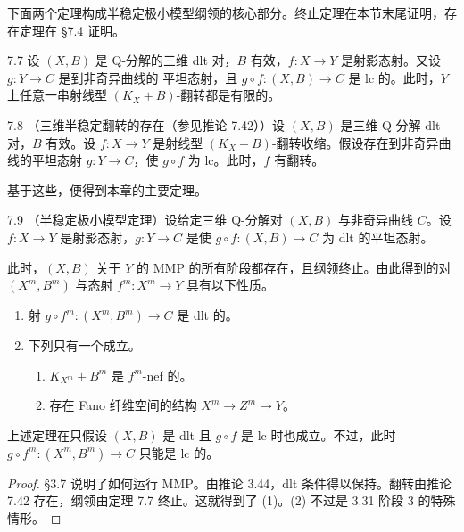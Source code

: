 下面两个定理构成半稳定极小模型纲领的核心部分。终止定理在本节末尾证明，存在定理在 §7.4 证明。

\begin{theorem*}{7.7}
设 $(X,B)$ 是 Q-分解的三维 dlt 对，$B$ 有效，$f\colon X\to Y$ 是射影态射。又设 $g\colon Y\to C$ 是到非奇异曲线的
平坦态射，且 $g\circ f\colon(X,B)\to C$ 是 lc 的。此时，$Y$ 上任意一串射线型 $(K_X+B)$-翻转都是有限的。
\end{theorem*}

\begin{theorem*}{7.8}
（三维半稳定翻转的存在（参见推论 7.42））设 $(X,B)$ 是三维 Q-分解 dlt 对，$B$ 有效。设 $f\colon X\to Y$ 是射线型 $(K_X+B)$-翻转收缩。假设存在到非奇异曲线的平坦态射 $g\colon Y\to C$，使 $g\circ f$ 为 lc。此时，$f$ 有翻转。
\end{theorem*}

基于这些，便得到本章的主要定理。

\begin{theorem*}{7.9}
（半稳定极小模型定理）设给定三维 Q-分解对 $(X,B)$ 与非奇异曲线 $C$。设 $f\colon X\to Y$ 是射影态射，$g\colon Y\to C$ 是使 $g\circ f\colon(X,B)\to C$ 为 dlt 的平坦态射。

此时，$(X,B)$ 关于 $Y$ 的 MMP 的所有阶段都存在，且纲领终止。由此得到的对 $(X^m,B^m)$ 与态射 $f^m\colon X^m\to Y$ 具有以下性质。
\begin{enumerate}[label=(\arabic*),leftmargin=2.4em,itemsep=1pt,topsep=2pt,parsep=0pt]
\item 射 $g\circ f^m\colon(X^m,B^m)\to C$ 是 dlt 的。
\item 下列只有一个成立。
\begin{enumerate}[label=(\alph*),leftmargin=2.2em,itemsep=1pt,topsep=1pt,parsep=0pt]
\item $K_{X^m}+B^m$ 是 $f^m$-nef 的。
\item 存在 Fano 纤维空间的结构 $X^m\to Z^m\to Y$。
\end{enumerate}
\end{enumerate}
\end{theorem*}


上述定理在只假设 $(X,B)$ 是 dlt 且 $g\circ f$ 是 lc 时也成立。不过，此时 $g\circ f^m\colon(X^m,B^m)\to C$ 只能是 lc 的。

\begin{proof}
§3.7 说明了如何运行 MMP。由推论 3.44，dlt 条件得以保持。翻转由推论 7.42 存在，纲领由定理 7.7 终止。这就得到了 (1)。(2) 不过是 3.31 阶段 3 的特殊情形。
\end{proof}

